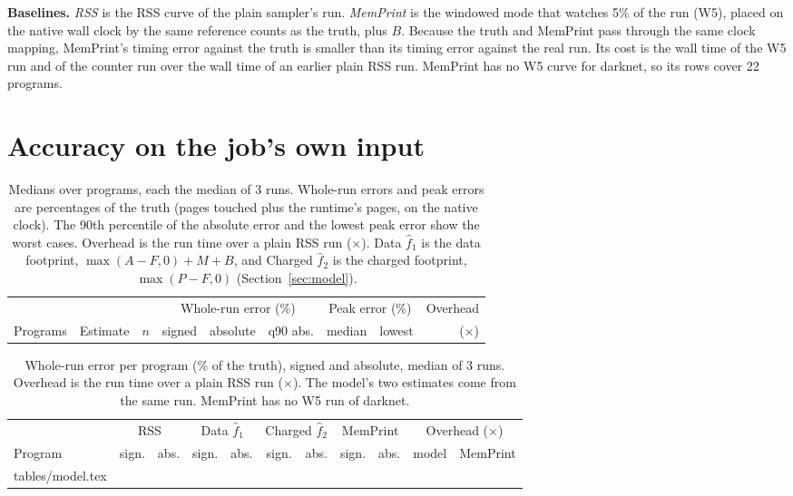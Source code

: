 \documentclass[11pt]{article}
\makeatletter
\newcommand{\memprint}{MemPrint}
\newcommand{\secref}[1]{Section~\ref{#1}}
\newcommand{\tabinput}[1]{\@@input #1 }   %
\makeatother
\begin{document}
\textbf{Baselines.} \emph{RSS} is the RSS curve of the plain sampler's run. \emph{\memprint{}} is the windowed mode
that watches 5\% of the run (W5), placed on the native wall clock by the same reference counts as the truth, plus $B$.
Because the truth and \memprint{} pass through the same clock mapping, \memprint{}'s timing error against the truth
is smaller than its timing error against the real run. Its cost is the wall time of the W5 run and of the counter run
over the wall time of an earlier plain RSS run. \memprint{} has no W5 curve for darknet, so its rows cover 22
programs.

\section{Accuracy on the job's own input}
\label{sec:repeat}

\begin{table}[t]
\centering
\small
\caption{Medians over programs, each the median of 3 runs. Whole-run errors and peak errors are percentages of the
truth (pages touched plus the runtime's pages, on the native clock). The 90th percentile of the absolute error and
the lowest peak error show the worst cases. Overhead is the run time over a plain RSS run ($\times$). Data
$\hat f_1$ is the data footprint, $\max(A - F, 0) + M + B$, and Charged $\hat f_2$ is the charged footprint,
$\max(P - F, 0)$ (\secref{sec:model}).}
\label{tab:summary}
\begin{tabular}{llrrrrrrr}
\toprule
 & & & \multicolumn{3}{c}{Whole-run error (\%)} & \multicolumn{2}{c}{Peak error (\%)} & Overhead \\
\cmidrule(lr){4-6}\cmidrule(lr){7-8}
Programs & Estimate & $n$ & signed & absolute & q90 abs. & median & lowest & ($\times$) \\
\midrule

\bottomrule
\end{tabular}
\end{table}

\begin{table}[t]
\centering
\small
\caption{Whole-run error per program (\% of the truth), signed and absolute, median of 3 runs. Overhead is the run
time over a plain RSS run ($\times$). The model's two estimates come from the same run. \memprint{} has no W5 run of
darknet.}
\label{tab:model}
\setlength{\tabcolsep}{4.5pt}
\begin{tabular}{lrrrrrrrrrr}
\toprule
 & \multicolumn{2}{c}{RSS} & \multicolumn{2}{c}{Data $\hat f_1$} & \multicolumn{2}{c}{Charged $\hat f_2$} &
 \multicolumn{2}{c}{\memprint{}} & \multicolumn{2}{c}{Overhead ($\times$)} \\
\cmidrule(lr){2-3}\cmidrule(lr){4-5}\cmidrule(lr){6-7}\cmidrule(lr){8-9}\cmidrule(lr){10-11}
Program & sign. & abs. & sign. & abs. & sign. & abs. & sign. & abs. & model & \memprint{} \\
\midrule
\tabinput{tables/model.tex}
\bottomrule
\end{tabular}
\end{table}
\end{document}
